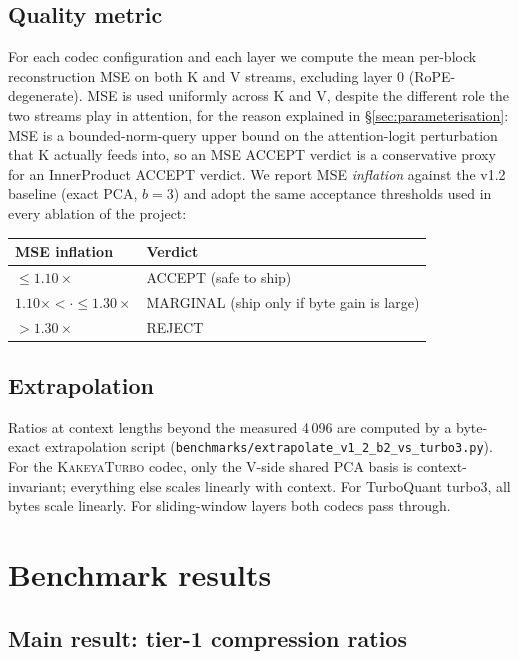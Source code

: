 \documentclass[11pt,a4paper]{article}
\theoremstyle{definition}
\theoremstyle{plain}
\begin{document}
\subsection{Quality metric}
For each codec configuration and each layer we compute the mean per-block reconstruction MSE on both K and V streams, excluding layer 0 (RoPE-degenerate). MSE is used uniformly across K and V, despite the different role the two streams play in attention, for the reason explained in \S\ref{sec:parameterisation}: MSE is a bounded-norm-query upper bound on the attention-logit perturbation that K actually feeds into, so an MSE ACCEPT verdict is a conservative proxy for an InnerProduct ACCEPT verdict. We report MSE \emph{inflation} against the v1.2 baseline (exact PCA, $b=3$) and adopt the same acceptance thresholds used in every ablation of the project:
\begin{center}
\begin{tabular}{ll}
  \toprule
  MSE inflation & Verdict \\
  \midrule
  $\leq 1.10 \times$ & ACCEPT (safe to ship) \\
  $1.10\times < \cdot \leq 1.30\times$ & MARGINAL (ship only if byte gain is large) \\
  $> 1.30 \times$ & REJECT \\
  \bottomrule
\end{tabular}
\end{center}

\subsection{Extrapolation}
Ratios at context lengths beyond the measured 4\,096 are computed by a byte-exact extrapolation script (\verb|benchmarks/extrapolate_v1_2_b2_vs_turbo3.py|). For the \textsc{KakeyaTurbo} codec, only the V-side shared PCA basis is context-invariant; everything else scales linearly with context. For TurboQuant turbo3, all bytes scale linearly. For sliding-window layers both codecs pass through.

\section{Benchmark results}
\label{sec:benchmark}

\subsection{Main result: tier-1 compression ratios}
\label{sec:main-result}
\end{document}
